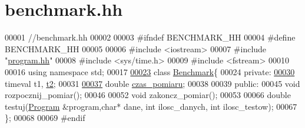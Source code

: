 \hypertarget{benchmark_8hh}{\section{benchmark.\-hh}
\label{benchmark_8hh}
}

\begin{DoxyCode}
00001 \textcolor{comment}{//benchmark.hh}
00002 
00003 \textcolor{preprocessor}{#ifndef BENCHMARK\_HH}
00004 \textcolor{preprocessor}{}\textcolor{preprocessor}{#define BENCHMARK\_HH}
00005 \textcolor{preprocessor}{}
00006 \textcolor{preprocessor}{#include <iostream>}
00007 \textcolor{preprocessor}{#include "\hyperlink{program_8hh}{program.hh}"}
00008 \textcolor{preprocessor}{#include <sys/time.h>}
00009 \textcolor{preprocessor}{#include <fstream>}
00010 
00016 \textcolor{keyword}{using namespace }std;
00017 
\hypertarget{benchmark_8hh_source_l00023}{}\hyperlink{class_benchmark}{00023} \textcolor{keyword}{class }\hyperlink{class_benchmark}{Benchmark}\{
00024 \textcolor{keyword}{private}:
\hypertarget{benchmark_8hh_source_l00030}{}\hyperlink{class_benchmark_a2b145dd2458fea33d6df41f310058bec}{00030}   timeval t1, \hyperlink{class_benchmark_a2b145dd2458fea33d6df41f310058bec}{t2};
00031 
\hypertarget{benchmark_8hh_source_l00037}{}\hyperlink{class_benchmark_ab72b3cbe324970fd8c738f03718d52fc}{00037}   \textcolor{keywordtype}{double} \hyperlink{class_benchmark_ab72b3cbe324970fd8c738f03718d52fc}{czas\_pomiaru};
00038 
00039 \textcolor{keyword}{public}:
00045   \textcolor{keywordtype}{void} rozpocznij\_pomiar();
00046 
00052   \textcolor{keywordtype}{void} zakoncz\_pomiar();
00053 
00066   \textcolor{keywordtype}{double} testuj(\hyperlink{class_program}{Program} &program,\textcolor{keywordtype}{char}* dane, \textcolor{keywordtype}{int} ilosc\_danych, \textcolor{keywordtype}{int} ilosc\_testow);
00067 \};
00068 
00069 \textcolor{preprocessor}{#endif}
\end{DoxyCode}
